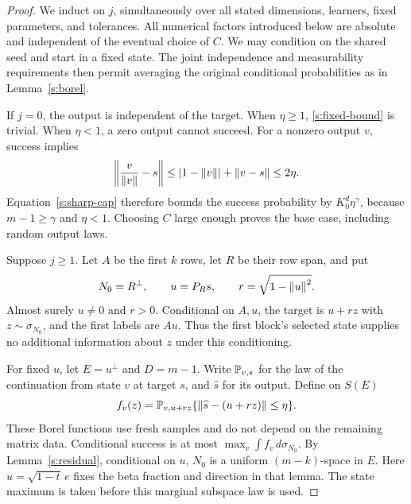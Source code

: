 \begin{proof}
We induct on \(j\), simultaneously over all stated dimensions,
learners, fixed parameters, and tolerances. All numerical factors introduced below are absolute and independent
of the eventual choice of \(C\). We may condition on the shared seed and start in a
fixed state. The joint independence and measurability requirements
then permit averaging the original conditional probabilities as in
Lemma~\ref{s:borel}.

If \(j=0\), the output is independent of the target. When
\(\eta\ge1\), \eqref{s:fixed-bound} is trivial. When \(\eta<1\),
a zero output cannot succeed. For a nonzero output \(v\), success
implies
\[
 \left\lVert \frac{v}{\left\lVert v\right\rVert}-s\right\rVert
 \le \left|1-\left\lVert v\right\rVert\right|+\left\lVert v-s\right\rVert\le2\eta.
\]
Equation~\eqref{s:sharp-cap} therefore bounds the success probability
by \(K_0^d\eta^\gamma\), because \(m-1\ge\gamma\) and
\(\eta<1\). Choosing \(C\) large enough proves the base case,
including random output laws.

Suppose \(j\ge1\). Let \(A\) be the first \(k\) rows, let \(R\) be
their row span, and put
\[
 N_0=R^\perp,\qquad u=P_Rs,\qquad r=\sqrt{1-\left\lVert u\right\rVert^2}.
\]
Almost surely \(u\ne0\) and \(r>0\). Conditional on \(A,u\), the
target is \(u+rz\) with \(z\sim\sigma_{N_0}\), and the first labels
are \(Au\). Thus the first block's selected state supplies no
additional information about \(z\) under this conditioning.

For fixed \(u\), let \(E=u^\perp\) and \(D=m-1\). Write
\(\mathbb P_{v,s}\) for the law of the continuation from state \(v\)
at target \(s\), and \(\widehat s\) for its output. Define on \(S(E)\)
\[
 f_v(z)=\mathbb P_{v,u+rz}\{\left\lVert \widehat s-(u+rz)\right\rVert\le\eta\}.
\]
These Borel functions use fresh samples and do not depend on the
remaining matrix data. Conditional success is at most
\(\max_v\int f_v\,d\sigma_{N_0}\). By Lemma~\ref{s:residual},
conditional on \(u\), \(N_0\) is a uniform \((m-k)\)-space in
\(E\). Here \(u=\sqrt{1-t}\,e\) fixes the beta fraction and direction
in that lemma. The state maximum is taken before this marginal
subspace law is used.


\end{proof}
